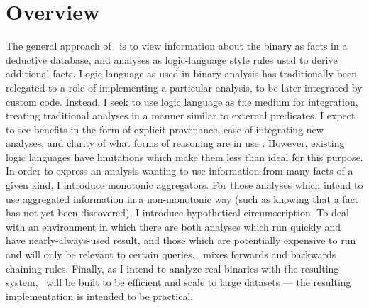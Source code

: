 \section{Overview}
The general approach of \sysname\ is to view information about the binary as facts in a deductive database, and analyses as logic-language style rules used to derive additional facts.
Logic language as used in binary analysis has traditionally been relegated to a role of implementing a particular analysis, to be later integrated by custom code.
Instead, I seek to use logic language as the medium for integration, treating traditional analyses in a manner similar to external predicates.
I expect to see benefits in the form of explicit provenance, ease of integrating new analyses, and clarity of what forms of reasoning are in use .
However, existing logic languages have limitations which make them less than ideal for this purpose.
In order to express an analysis wanting to use information from many facts of a given kind, I introduce monotonic aggregators.
For those analyses which intend to use aggregated information in a non-monotonic way (such as knowing that a fact has not yet been discovered), I introduce hypothetical circumscription.
To deal with an environment in which there are both analyses which run quickly and have nearly-always-used result, and those which are potentially expensive to run and will only be relevant to certain queries, \sysname\ mixes forwards and backwards chaining rules.
Finally, as I intend to analyze real binaries with the resulting system, \sysname\ will be built to be efficient and scale to large datasets --- the resulting implementation is intended to be practical.

